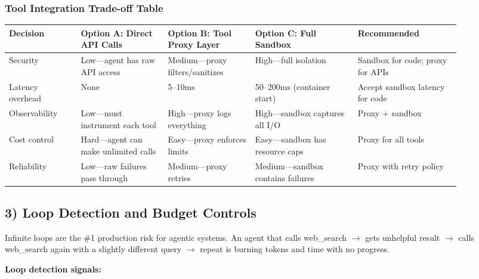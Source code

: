 \subsubsection*{Tool Integration Trade-off Table}

\begin{tabular}{|p{0.14\linewidth}|p{0.17\linewidth}|p{0.17\linewidth}|p{0.20\linewidth}|p{0.20\linewidth}|}
\hline
\textbf{Decision} & \textbf{Option A: Direct API Calls} & \textbf{Option B: Tool Proxy Layer} & \textbf{Option C: Full Sandbox} & \textbf{Recommended} \\
\hline
Security & Low---agent has raw API access & Medium---proxy filters/sanitizes & High---full isolation & Sandbox for code; proxy for APIs \\
\hline
Latency overhead & None & 5--10ms & 50--200ms (container start) & Accept sandbox latency for code \\
\hline
Observability & Low---must instrument each tool & High---proxy logs everything & High---sandbox captures all I/O & Proxy + sandbox \\
\hline
Cost control & Hard---agent can make unlimited calls & Easy---proxy enforces limits & Easy---sandbox has resource caps & Proxy for all tools \\
\hline
Reliability & Low---raw failures pass through & Medium---proxy retries & Medium---sandbox contains failures & Proxy with retry policy \\
\hline
\end{tabular}

\subsection*{3) Loop Detection and Budget Controls}

Infinite loops are the \#1 production risk for agentic systems. An agent that calls web\_search $\rightarrow$ gets unhelpful result $\rightarrow$ calls web\_search again with a slightly different query $\rightarrow$ repeat is burning tokens and time with no progress.

\textbf{Loop detection signals:}

